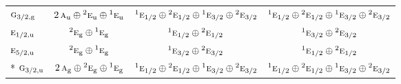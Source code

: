 \documentclass[10pt,a4paper]{article}
\numberwithin{equation}{section}
\newcommand{\irr}[1]{\text{\normalfont\scshape #1}}
\newcommand{\conjpair}[1]{{}^{#1}}
\newcommand{\ptag}[1]{\mathrm{#1}}
\begin{document}
{\begin{longtable}{@{}lccc@{}}
$\irr{g}_{3/2,\ptag{g}}$ & $2\,\irr{a}_{\ptag{u}}\oplus \conjpair{2}\irr{e}_{\ptag{u}}\oplus \conjpair{1}\irr{e}_{\ptag{u}}$ & $\conjpair{1}\irr{e}_{1/2}\oplus \conjpair{2}\irr{e}_{1/2}\oplus \conjpair{1}\irr{e}_{3/2}\oplus \conjpair{2}\irr{e}_{3/2}$ & $\conjpair{1}\irr{e}_{1/2}\oplus \conjpair{2}\irr{e}_{1/2}\oplus \conjpair{1}\irr{e}_{3/2}\oplus \conjpair{2}\irr{e}_{3/2}$\\
$\irr{e}_{1/2,\ptag{u}}$ & $\conjpair{2}\irr{e}_{\ptag{g}}\oplus \conjpair{1}\irr{e}_{\ptag{g}}$ & $\conjpair{1}\irr{e}_{1/2}\oplus \conjpair{2}\irr{e}_{1/2}$ & $\conjpair{1}\irr{e}_{3/2}\oplus \conjpair{2}\irr{e}_{3/2}$\\
$\irr{e}_{5/2,\ptag{u}}$ & $\conjpair{2}\irr{e}_{\ptag{g}}\oplus \conjpair{1}\irr{e}_{\ptag{g}}$ & $\conjpair{1}\irr{e}_{3/2}\oplus \conjpair{2}\irr{e}_{3/2}$ & $\conjpair{1}\irr{e}_{1/2}\oplus \conjpair{2}\irr{e}_{1/2}$\\*
$\irr{g}_{3/2,\ptag{u}}$ & $2\,\irr{a}_{\ptag{g}}\oplus \conjpair{2}\irr{e}_{\ptag{g}}\oplus \conjpair{1}\irr{e}_{\ptag{g}}$ & $\conjpair{1}\irr{e}_{1/2}\oplus \conjpair{2}\irr{e}_{1/2}\oplus \conjpair{1}\irr{e}_{3/2}\oplus \conjpair{2}\irr{e}_{3/2}$ & $\conjpair{1}\irr{e}_{1/2}\oplus \conjpair{2}\irr{e}_{1/2}\oplus \conjpair{1}\irr{e}_{3/2}\oplus \conjpair{2}\irr{e}_{3/2}$\\
\bottomrule\end{longtable}}
\end{document}

